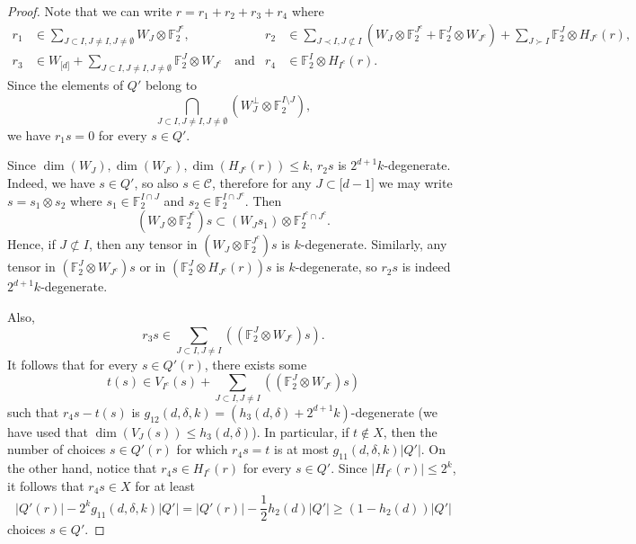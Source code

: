 \documentclass{toc}
\newcommand\F{\mathbb{F}}
\renewcommand\d{\delta}
\newcommand \cC{\mathcal C}
\newcommand \s{\subset}
\begin{document}
\begin{proof}
  Note that we can write $r=r_1+r_2+r_3+r_4$ where
  \begin{align*}
    r_1 &\in \sum_{J\subset I,J\neq I,J\neq \emptyset} W_J\otimes \F_2^{J^c}, & r_2 &\in \sum_{J\prec I, J\not \subset I} (W_J\otimes \F_2^{J^c}+\F_2^{J}\otimes W_{J^c})+\sum_{J\succ I} \F_2^{J}\otimes H_{J^c}(r),\\
    r_3 &\in W_{\lbrack d\rbrack}+\sum_{J\subset I,J\neq I,J\neq \emptyset} \F_2^{J}\otimes W_{J^c} \quad\text{and} &  r_4 &\in \F_2^{I}\otimes H_{I^c}(r).
  \end{align*}
  Since the elements of $Q'$ belong to
  \[
    \bigcap_{J\subset I,J\neq I,J\neq \emptyset}(W_J^{\perp}\otimes \F_2^{I \setminus J}),
  \]
  we have $r_1s=0$ for every $s\in Q'$.
	
  Since $\dim(W_J),\dim(W_{J^c}),\dim(H_{J^c}(r))\leq k$, $r_2s$ is $2^{d+1}k$-degenerate. Indeed, we have $s\in Q'$, so also $s\in \cC$, therefore for any $J\s \lbrack d-1\rbrack$ we may write $s=s_1\otimes s_2$ where $s_1\in \F_2^{I\cap J}$ and $s_2\in \F_2^{I\cap J^c}$. Then
  \[
    (W_J\otimes \F_2^{J^c})s\s (W_Js_1)\otimes \F_2^{I^c\cap J^c}.
  \]
  Hence, if $J\not \s I$, then any tensor in
  $(W_J\otimes \F_2^{J^c})s$ is $k$-degenerate. Similarly, any tensor
  in $(\F_2^J\otimes W_{J^c})s$ or in $(\F_2^J\otimes H_{J^c}(r))s$ is
  $k$-degenerate, so $r_2s$ is indeed $2^{d+1}k$-degenerate.
	
  Also,
  \[
    r_3s\in \sum_{J\subset I,J\neq I} ((\F_2^{J}\otimes W_{J^c})s).
  \]
  It follows that for every $s\in Q'(r)$, there exists some
  \[
    t(s)\in V_{I^c}(s)+\sum_{J\subset I,J\neq I} ((\F_2^{J}\otimes
    W_{J^c})s)
  \]
  such that $r_4s-t(s)$ is
  $g_{12}(d,\d,k)=(h_3(d,\d)+2^{d+1}k)$-degenerate (we have used that
  $\dim (V_{J}(s))\leq h_3(d,\d)$). In particular, if $t\not \in X$,
  then the number of choices $s\in Q'(r)$ for which $r_4s=t$ is at
  most $g_{11}(d,\d,k)|Q'|$. On the other hand, notice that
  $r_4s\in H_{I^c}(r)$ for every $s\in Q'$. Since
  $|H_{I^c}(r)|\leq 2^{k}$, it follows that $r_4s\in X$ for at least
  \[
    |Q'(r)|-2^kg_{11}(d,\d,k)|Q'|=|Q'(r)|-\frac{1}{2}h_2(d)|Q'|\geq
    (1-h_2(d))|Q'|
  \]
  choices $s\in Q'$.
	

\end{proof}
\end{document}
